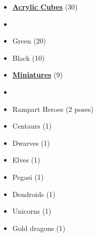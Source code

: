 \begin{multicols*}{3}
\begin{itemize}[leftmargin=0pt, label={}, noitemsep, noitemsep]
  \item \textbf{\normalsize{\underline{Acrylic Cubes}}} (30)
  \item
  \item Green (20)
  \item Black (10)
\end{itemize}

\begin{itemize}[leftmargin=0pt, label={}, noitemsep, noitemsep]
  \item \textbf{\normalsize{\underline{Miniatures}}} (9)
  \item
  \item Rampart Heroes (2 poses)
  \item Centaurs (1)
  \item Dwarves (1)
  \item Elves (1)
  \item Pegasi (1)
  \item Dendroids (1)
  \item Unicorns (1)
  \item Gold dragons (1)
\end{itemize}

\columnbreak


\end{multicols*}
